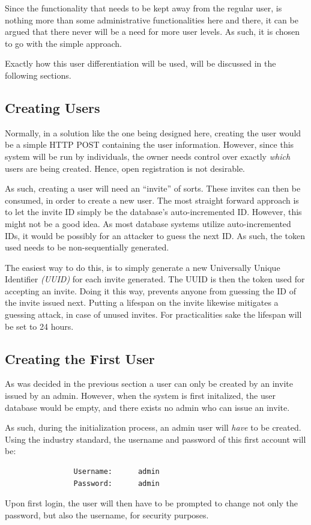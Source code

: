 		Since the functionality that needs to be kept away from the regular user, is nothing more than some administrative functionalities here and there, it can be argued that there never will be a need for more user levels. As such, it is chosen to go with the simple approach. 

		Exactly how this user differentiation will be used, will be discussed in the following sections.

		\subsection{Creating Users}	
			Normally, in a solution like the one being designed here, creating the user would be a simple HTTP POST containing the user information. However, since this system will be run by individuals, the owner needs control over exactly \emph{which} users are being created. Hence, open registration is not desirable.

			As such, creating a user will need an ``invite'' of sorts. These invites can then be consumed, in order to create a new user. The most straight forward approach is to let the invite ID simply be the database's auto-incremented ID. However, this might not be a good idea. As most database systems utilize auto-incremented IDs, it would be possibly for an attacker to guess the next ID. As such, the token used needs to be non-sequentially generated.

			The easiest way to do this, is to simply generate a new Universally Unique Identifier \emph{(UUID)} for each invite generated. The UUID is then the token used for accepting an invite. Doing it this way, prevents anyone from guessing the ID of the invite issued next. Putting a lifespan on the invite likewise mitigates a guessing attack, in case of unused invites. For practicalities sake the lifespan will be set to 24 hours.

		\subsection{Creating the First User}
			As was decided in the previous section a user can only be created by an invite issued by an admin. However, when the system is first initalized, the user database would be empty, and there exists no admin who can issue an invite.

			As such, during the initialization process, an admin user will \emph{have} to be created. Using the industry standard, the username and password of this first account will be:
			\begin{verbatim}
				Username:      admin
				Password:      admin
			\end{verbatim}
			Upon first login, the user will then have to be prompted to change not only the password, but also the username, for security purposes.

